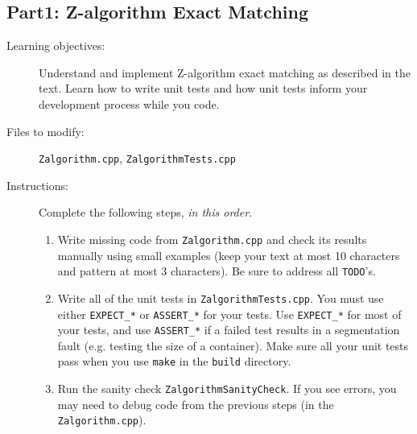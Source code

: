 \documentclass[paper=a4, fontsize=11pt]{scrartcl} %
\numberwithin{equation}{section} %
\numberwithin{figure}{section} %
\numberwithin{table}{section} %
\begin{document}
\subsection*{Part1: Z-algorithm Exact Matching}
\begin{description}
	\item[Learning objectives:] Understand and implement Z-algorithm exact matching as described in the text. Learn how to write unit tests and how unit tests inform your development process while you code.
	\item[Files to modify:] \texttt{Zalgorithm.cpp}, \texttt{ZalgorithmTests.cpp}
	\item[Instructions:] Complete the following steps, \textit{in this order}.
		\begin{enumerate}
			\item Write missing code from \texttt{Zalgorithm.cpp} and check its results manually using small examples (keep your text at most 10 characters and pattern at most 3 characters). Be sure to address all \texttt{TODO}'s.
			\item Write all of the unit tests in \texttt{ZalgorithmTests.cpp}. You must use either \texttt{EXPECT\_*} or \texttt{ASSERT\_*} for your tests. Use \texttt{EXPECT\_*} for most of your tests, and use \texttt{ASSERT\_*} if a failed test results in a segmentation fault (e.g. testing the size of a container). Make sure all your unit tests pass when you use \texttt{make} in the \texttt{build} directory.
			\item Run the sanity check \texttt{ZalgorithmSanityCheck}. If you see errors, you may need to debug code from the previous steps (in the \texttt{Zalgorithm.cpp}).
		\end{enumerate}
\end{description}
\end{document}
